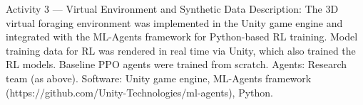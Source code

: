 
Activity 3 — Virtual Environment and Synthetic Data
Description: The 3D virtual foraging environment was implemented in the Unity game engine and integrated with the ML-Agents framework for Python-based RL training. Model training data for RL was rendered in real time via Unity, which also trained the RL models. Baseline PPO agents were trained from scratch.
Agents: Research team (as above). Software: Unity game engine, ML-Agents framework (https://github.com/Unity-Technologies/ml-agents), Python.







